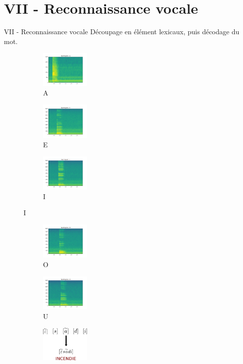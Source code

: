 \documentclass[10pt]{beamer}
\begin{document}
\section{VII - Reconnaissance vocale}
\begin{frame}{VII - Reconnaissance vocale}
Découpage en élément lexicaux, puis décodage du mot.
\begin{figure}
	\begin{subfigure}[]{0.3\textwidth}
		\includegraphics[width=90px]{1-A.jpg}
  		\caption{A}
	\end{subfigure}
	\begin{subfigure}[]{0.3\textwidth}
		\includegraphics[width=90px]{1-E.jpg}
  		\caption{E}
	\end{subfigure}
	\begin{subfigure}[]{0.3\textwidth}
		\includegraphics[width=90px]{1-I.jpg}
		\caption{I}
	\end{subfigure}
\end{figure}
\begin{figure}
	\begin{subfigure}[]{0.3\textwidth}
		\includegraphics[width=90px]{1-O.jpg}
  		\caption{O}
	\end{subfigure}
	\begin{subfigure}[]{0.3\textwidth}
		\includegraphics[width=90px]{1-U.jpg}
  		\caption{U}
	\end{subfigure}
	\begin{subfigure}[]{0.3\textwidth}
		\includegraphics[width=90px]{2-Matching.png}
	\end{subfigure}
\end{figure}
\end{frame}
\end{document}
